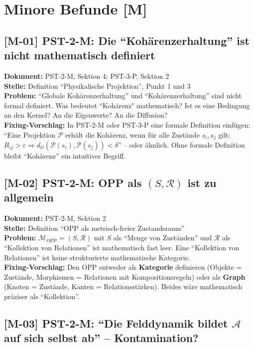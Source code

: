 \documentclass[11pt,a4paper]{article}
\newcommand{\M}[1]{\textbf{[M-#1]}}
\newcommand{\Dok}[1]{\textbf{Dokument:} #1\\}
\newcommand{\Stelle}[1]{\textbf{Stelle:} #1\\}
\newcommand{\Prob}[1]{\textbf{Problem:} #1\\}
\newcommand{\Fix}[1]{\textbf{Fixing-Vorschlag:} #1\\}
\begin{document}
\section{Minore Befunde [M]}

\subsection{\M{01} PST-2-M: Die ``Koh\"{a}renzerhaltung'' ist nicht
mathematisch definiert}

\Dok{PST-2-M, Sektion 4; PST-3-P, Sektion 2}
\Stelle{Definition ``Physikalische Projektion'', Punkt 1 und 3}
\Prob{``Globale Koh\"{a}renzerhaltung'' und ``Koh\"{a}renzerhaltung''
sind nicht formal definiert. Was bedeutet ``Koh\"{a}renz"
mathematisch? Ist es eine Bedingung an den Kernel? An die
Eigenwerte? An die Diffusion?}
\Fix{In PST-2-M oder PST-3-P eine formale Definition einf\"{u}gen:
``Eine Projektion $\mathcal{P}$ erh\"{a}lt die Koh\"{a}renz, wenn f\"{u}r
alle Zust\"{a}nde $s_i, s_j$ gilt: $R_{ij} > \varepsilon \Rightarrow
d_{\mathcal{O}}(\mathcal{P}(s_i), \mathcal{P}(s_j)) < \delta$'' --
oder \"{a}hnlich. Ohne formale Definition bleibt ``Koh\"{a}renz'' ein
intuitiver Begriff.}

\subsection{\M{02} PST-2-M: OPP als $(S, \mathcal{R})$ ist zu allgemein}

\Dok{PST-2-M, Sektion 2}
\Stelle{Definition ``OPP als metrisch-freier Zustandsraum''}
\Prob{$\mathcal{M}_{\text{OPP}} = (S, \mathcal{R})$ mit $S$ als
``Menge von Zust\"{a}nden'' und $\mathcal{R}$ als ``Kollektion von
Relationen'' ist mathematisch fast leer. Eine ``Kollektion von
Relationen'' ist keine strukturierte mathematische Kategorie.}
\Fix{Den OPP entweder als \textbf{Kategorie} definieren (Objekte =
Zust\"{a}nde, Morphismen = Relationen mit Kompositionsregeln) oder als
\textbf{Graph} (Knoten = Zust\"{a}nde, Kanten = Relationsst\"{a}rken).
Beides w\"{a}re mathematisch pr\"{a}ziser als ``Kollektion''.}

\subsection{\M{03} PST-2-M: ``Die Felddynamik bildet $\mathcal{A}$ auf
sich selbst ab'' -- Kontamination?}
\end{document}
